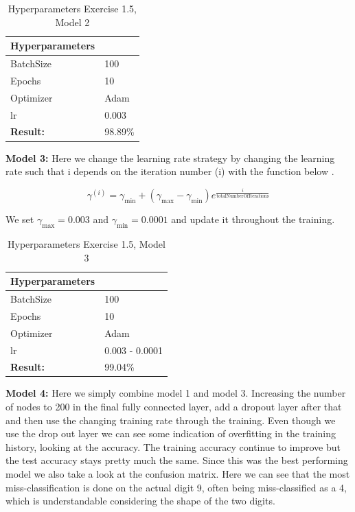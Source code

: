 \documentclass[a4paper,10pt]{article}
\begin{document}
\begin{table}[ht!]
\centering
\begin{tabular}{ll}\hline
 \textbf{Hyperparameters}&    \\ \hline
 BatchSize&  100  \\
 Epochs&  10 \\ 
 Optimizer& Adam  \\
 lr& 0.003\\ \hline
\textbf{Result: }&   98.89\% \\ \hline
\end{tabular}
\caption{Hyperparameters Exercise 1.5, Model 2}
\label{tab:tab7}
\end{table}

\textbf{Model 3:} Here we change the learning rate strategy by changing the learning rate such that i depends on the iteration number (i) with the function below \cite{SML}.

    \begin{equation}
        \gamma^{(i)} = \gamma_{\text{min}} + (\gamma_{\text{max}} - \gamma_{\text{min}})e^{\frac{i} {\text{totalNumberOfIterations}} }
    \end{equation}

We set $\gamma_{\text{max}} = 0.003$ and $\gamma_{\text{min}} = 0.0001$ and update it throughout the training.

\begin{table}[ht!]
\centering
\begin{tabular}{ll}\hline
 \textbf{Hyperparameters}&    \\ \hline
 BatchSize&  100  \\
 Epochs&  10 \\ 
 Optimizer& Adam  \\
 lr& 0.003 - 0.0001 \\ \hline
\textbf{Result: }&   99.04\% \\ \hline
\end{tabular}
\caption{Hyperparameters Exercise 1.5, Model 3}
\label{tab:tab7}
\end{table}

\newpage

\textbf{Model 4:} Here we simply combine model 1 and model 3. Increasing the number of nodes to 200 in the final fully connected layer, add a dropout layer after that and then use the changing training rate through the training. Even though we use the drop out layer we can see some indication of overfitting in the training history, looking at the accuracy. The training accuracy continue to improve but the test accuracy stays pretty much the same. Since this was the best performing model we also take a look at the confusion matrix. Here we can see that the most miss-classification is done on the actual digit 9, often being miss-classified as a 4, which is understandable considering the shape of the two digits. 
\end{document}
